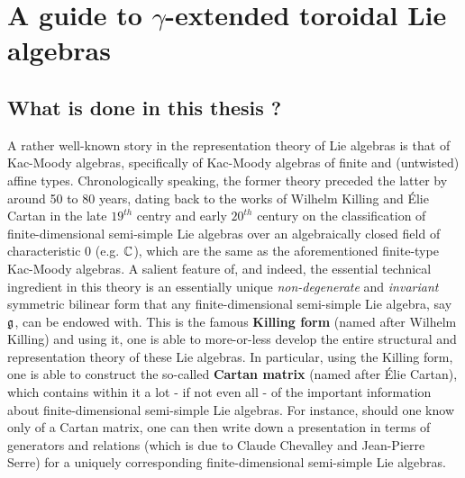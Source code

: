 \section{A guide to \texorpdfstring{$\gamma$}{}-extended toroidal Lie algebras}
    \subsection{What is done in this thesis ?}
        A rather well-known story in the representation theory of Lie algebras is that of Kac-Moody algebras, specifically of Kac-Moody algebras of finite and (untwisted) affine types. Chronologically speaking, the former theory preceded the latter by around 50 to 80 years, dating back to the works of Wilhelm Killing and \'Elie Cartan in the late $19^{th}$ centry and early $20^{th}$ century on the classification of finite-dimensional semi-simple Lie algebras over an algebraically closed field of characteristic $0$ (e.g. $\mathbb{C}$), which are the same as the aforementioned finite-type Kac-Moody algebras. A salient feature of, and indeed, the essential technical ingredient in this theory is an essentially unique \textit{non-degenerate} and \textit{invariant} symmetric bilinear form that any finite-dimensional semi-simple Lie algebra, say $\mathfrak{g}$, can be endowed with. This is the famous \textbf{Killing form} (named after Wilhelm Killing) and using it, one is able to more-or-less develop the entire structural and representation theory of these Lie algebras. In particular, using the Killing form, one is able to construct the so-called \textbf{Cartan matrix} (named after \'Elie Cartan), which contains within it a lot - if not even all - of the important information about finite-dimensional semi-simple Lie algebras. For instance, should one know only of a Cartan matrix, one can then write down a presentation in terms of generators and relations (which is due to Claude Chevalley and Jean-Pierre Serre) for a uniquely corresponding finite-dimensional semi-simple Lie algebras. 

